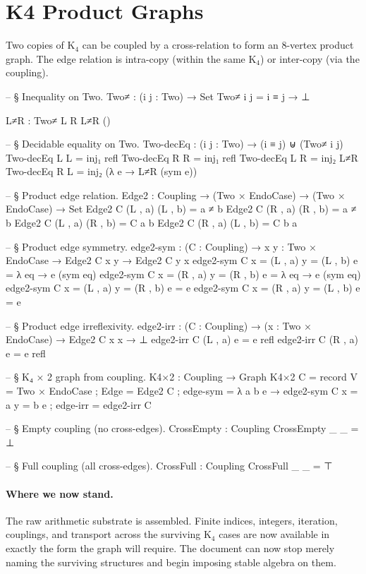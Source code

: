 \documentclass[11pt,a4paper]{book}
\def\texorpdfstring#1#2{#2}%
\begin{document}
\section{K\texorpdfstring{$_4$}{4} Product Graphs}

Two copies of K$_4$ can be coupled by a cross-relation to form an $8$-vertex product
graph. The edge relation is intra-copy (within the same K$_4$) or inter-copy (via the
coupling).

\begin{code}
-- § Inequality on Two.
Two≠ : (i j : Two) → Set
Two≠ i j = i ≡ j → ⊥

L≠R : Two≠ L R
L≠R ()

-- § Decidable equality on Two.
Two-decEq : (i j : Two) → (i ≡ j) ⊎ (Two≠ i j)
Two-decEq L L = inj₁ refl
Two-decEq R R = inj₁ refl
Two-decEq L R = inj₂ L≠R
Two-decEq R L = inj₂ (λ e → L≠R (sym e))

-- § Product edge relation.
Edge2 : Coupling → (Two × EndoCase) → (Two × EndoCase) → Set
Edge2 C (L , a) (L , b) = a ≠ b
Edge2 C (R , a) (R , b) = a ≠ b
Edge2 C (L , a) (R , b) = C a b
Edge2 C (R , a) (L , b) = C b a

-- § Product edge symmetry.
edge2-sym : (C : Coupling) → {x y : Two × EndoCase} → Edge2 C x y → Edge2 C y x
edge2-sym C {x = (L , a)} {y = (L , b)} e = λ eq → e (sym eq)
edge2-sym C {x = (R , a)} {y = (R , b)} e = λ eq → e (sym eq)
edge2-sym C {x = (L , a)} {y = (R , b)} e = e
edge2-sym C {x = (R , a)} {y = (L , b)} e = e

-- § Product edge irreflexivity.
edge2-irr : (C : Coupling) → (x : Two × EndoCase) → Edge2 C x x → ⊥
edge2-irr C (L , a) e = e refl
edge2-irr C (R , a) e = e refl

-- § K₄ × 2 graph from coupling.
K4×2 : Coupling → Graph
K4×2 C = record
  { V = Two × EndoCase
  ; Edge = Edge2 C
  ; edge-sym = λ {a} {b} e → edge2-sym C {x = a} {y = b} e
  ; edge-irr = edge2-irr C
  }

-- § Empty coupling (no cross-edges).
CrossEmpty : Coupling
CrossEmpty _ _ = ⊥

-- § Full coupling (all cross-edges).
CrossFull : Coupling
CrossFull _ _ = ⊤
\end{code}

\paragraph{Where we now stand.}
The raw arithmetic substrate is assembled. Finite indices, integers, iteration, couplings, and transport across the surviving K$_4$ cases are now available in exactly the form the graph will require. The document can now stop merely naming the surviving structures and begin imposing stable algebra on them.
\end{document}
